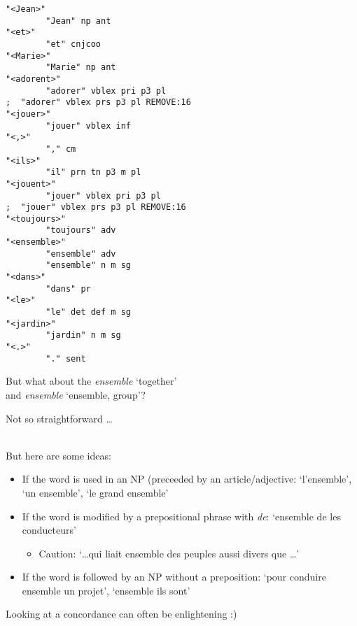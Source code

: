 \documentclass[10pt,xetex]{beamer} %
\begin{document}
\begin{frame}[fragile]

\begin{multicols}{2}
\begin{verbatim}
"<Jean>"
        "Jean" np ant
"<et>"
        "et" cnjcoo
"<Marie>"
        "Marie" np ant
"<adorent>"
        "adorer" vblex pri p3 pl
;  "adorer" vblex prs p3 pl REMOVE:16
"<jouer>"
        "jouer" vblex inf
"<,>"
        "," cm
"<ils>"
        "il" prn tn p3 m pl
"<jouent>"
        "jouer" vblex pri p3 pl
;  "jouer" vblex prs p3 pl REMOVE:16
"<toujours>"
        "toujours" adv
"<ensemble>"
        "ensemble" adv
        "ensemble" n m sg
"<dans>"
        "dans" pr
"<le>"
        "le" det def m sg
"<jardin>"
        "jardin" n m sg
"<.>"
        "." sent

\end{verbatim}
\end{multicols}

\end{frame}

\begin{frame}

\begin{center}
But what about the \emph{ensemble} `together' \\ and \emph{ensemble} `ensemble, group'?
\end{center}

Not so straightforward \ldots \\
~\\

\pause

But here are some ideas:

\begin{itemize}
  \item If the word is used in an NP (preceeded by an article/adjective: `l'ensemble', `un ensemble', `le grand ensemble'
  \item If the word is modified by a prepositional phrase with \emph{de}: `ensemble de les conducteurs'
  \begin{itemize}
    \item Caution: `\ldots qui liait ensemble des peuples aussi divers que \ldots'
  \end{itemize}
  \item If the word is followed by an NP without a preposition: `pour conduire ensemble un projet', `ensemble ils sont'
\end{itemize}

Looking at a concordance can often be enlightening :)

\end{frame}
\end{document}
